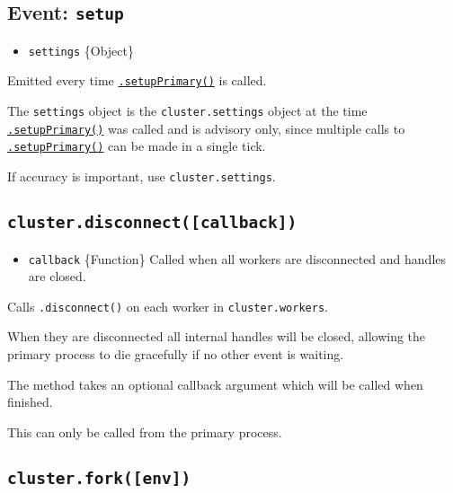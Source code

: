 \subsection{\texorpdfstring{Event:
\texttt{\textquotesingle{}setup\textquotesingle{}}}{Event: \textquotesingle setup\textquotesingle{}}}\label{event-setup}

\begin{itemize}
\tightlist
\item
  \texttt{settings} \{Object\}
\end{itemize}

Emitted every time
\hyperref[clustersetupprimarysettings]{\texttt{.setupPrimary()}} is
called.

The \texttt{settings} object is the \texttt{cluster.settings} object at
the time
\hyperref[clustersetupprimarysettings]{\texttt{.setupPrimary()}} was
called and is advisory only, since multiple calls to
\hyperref[clustersetupprimarysettings]{\texttt{.setupPrimary()}} can be
made in a single tick.

If accuracy is important, use \texttt{cluster.settings}.

\subsection{\texorpdfstring{\texttt{cluster.disconnect({[}callback{]})}}{cluster.disconnect({[}callback{]})}}\label{cluster.disconnectcallback}

\begin{itemize}
\tightlist
\item
  \texttt{callback} \{Function\} Called when all workers are
  disconnected and handles are closed.
\end{itemize}

Calls \texttt{.disconnect()} on each worker in \texttt{cluster.workers}.

When they are disconnected all internal handles will be closed, allowing
the primary process to die gracefully if no other event is waiting.

The method takes an optional callback argument which will be called when
finished.

This can only be called from the primary process.

\subsection{\texorpdfstring{\texttt{cluster.fork({[}env{]})}}{cluster.fork({[}env{]})}}\label{cluster.forkenv}

